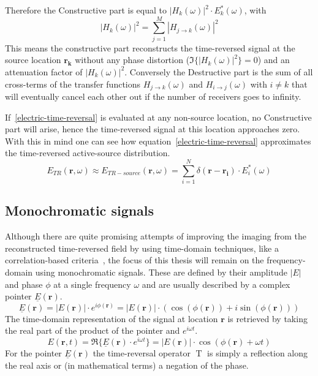 Therefore the Constructive part is equal to \(|H_k(\omega)|^2 \cdot E^*_k(\omega)\), with
\begin{equation}
    |H_k(\omega)|^2 = \sum_{j=1}^{M} |H_{j\rightarrow k}(\omega)|^2
\end{equation}
This means the constructive part reconstructs the time-reversed signal at the source location \(\mathbf{r_k}\) without any phase distortion (\(\Im \{{|H_k(\omega)|^2}\} = 0\)) and an attenuation factor of \(|H_k(\omega)|^2\).
Conversely the Destructive part is the sum of all cross-terms of the transfer functions \(H_{j\rightarrow k}(\omega)\) and \(H_{i\rightarrow j}(\omega)\) with \(i \neq k\) that will eventually cancel each other out if the number of receivers goes to infinity.

If~\eqref{electric-time-reversal} is evaluated at any non-source location, no Constructive part will arise, hence the time-reversed signal at this location approaches zero.
With this in mind one can see how equation~\eqref{electric-time-reversal} approximates the time-reversed active-source distribution. 
\begin{equation}
    E_{TR}(\mathbf{r}, \omega) \approx E_{TR-source}(\mathbf{r}, \omega) =  \sum_{i=1}^{N} \delta(\mathbf{r}-\mathbf{r_i}) \cdot E^*_i(\omega)
\end{equation}

\subsection{Monochromatic signals}
Although there are quite promising attempts of improving the imaging from the reconstructed time-reversed field by using time-domain techniques, like a correlation-based criteria~\parencite{li_correlation-based_2021}, the focus of this thesis will remain on the frequency-domain using monochromatic signals.
These are defined by their amplitude \(|E|\) and phase \(\phi \) at a single frequency \(\omega \) and are usually described by a complex pointer \(\underline{E}(\mathbf{r})\).
\begin{equation}
    \underline{E}(\mathbf{r}) = |E(\mathbf{r})| \cdot e^{i \phi(\mathbf{r})} = |E(\mathbf{r})| \cdot (\cos(\phi(\mathbf{r})) + i \sin(\phi(\mathbf{r})))
\end{equation}
The time-domain representation of the signal at location \(\mathbf{r}\) is retrieved by taking the real part of the product of the pointer and \(e^{i \omega t}\).
\begin{equation}
    E(\mathbf{r}, t) = \Re \{\underline{E}(\mathbf{r}) \cdot e^{i \omega t}\} = |E(\mathbf{r})| \cdot \cos(\phi(\mathbf{r}) + \omega t)
\end{equation}
For the pointer \(\underline{E}(\mathbf{r})\) the time-reversal operator \(\operatorname{T}\) is simply a reflection along the real axis or (in mathematical terms) a negation of the phase.

